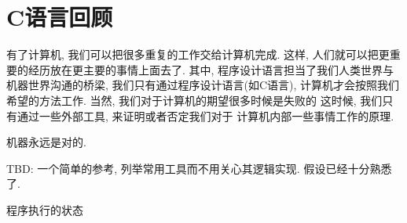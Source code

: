\part{C语言回顾}

有了计算机, 我们可以把很多重复的工作交给计算机完成.
这样, 人们就可以把更重要的经历放在更主要的事情上面去了. 
其中, 程序设计语言担当了我们人类世界与机器世界沟通的桥梁, 
我们只有通过程序设计语言(如C语言), 计算机才会按照我们
希望的方法工作. 当然, 我们对于计算机的期望很多时候是失败的
这时候, 我们只有通过一些外部工具, 来证明或者否定我们对于
计算机内部一些事情工作的原理. 

\begin{axiom}
    机器永远是对的. 
\end{axiom}

TBD: 一个简单的参考, 列举常用工具而不用关心其逻辑实现. 假设已经十分熟悉
了. 

 程序执行的状态 

 